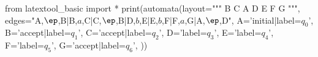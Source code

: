 from latextool_basic import *
print(automata(layout="""
   B  C
A
   D  E  F  G
""",
edges="A,$\ep$,B|B,$a$,C|C,$\ep$,B|D,$b$,E|E,$b$,F|F,$a$,G|A,$\ep$,D",
A='initial|label=$q_0$',
B='accept|label=$q_1$',
C='accept|label=$q_2$',
D='label=$q_3$',
E='label=$q_4$',
F='label=$q_5$',
G='accept|label=$q_6$',
))
